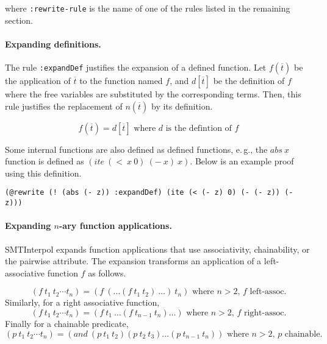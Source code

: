 \documentclass[a4paper]{article}
\newcommand\si{SMTInterpol\xspace}
\begin{document}
where \texttt{:rewrite-rule} is the name of one of the rules listed in
the remaining section.


\paragraph{Expanding definitions.}  The rule \texttt{:expandDef} justifies
the expansion of a defined function.  Let $f(\overline{t})$ be the
application of $\overline{t}$ to the function named $f$, and
$d[\overline{t}]$ be the definition of $f$ where the free variables are
substituted by the corresponding terms.  Then, this rule justifies the
replacement of $n(\overline{t})$ by its definition.

\begin{equation}
f(\overline{t}) = d[\overline{t}]
\text{ where $d$ is the defintion of $f$} \tag{expandDef}
\end{equation}

Some internal functions are also defined as defined functions,
e.\,g., the $abs\ x$ function is defined as $(ite\ (<\ x\ 0)\ (-\ x)\ x)$. Below is an example proof using this definition.
\begin{verbatim}
(@rewrite (! (abs (- z)) :expandDef) (ite (< (- z) 0) (- (- z)) (- z)))
\end{verbatim}

\paragraph{Expanding $n$-ary function applications.}  \si expands function
applications that use associativity, chainability, or the pairwise attribute.
The expansion transforms an application of a left-associative function $f$ as follows.

\begin{equation*}
  (f\ t_1\ t_2 \cdots t_n) = (f\ (\ldots (f\ t_1\ t_2)\ \ldots)\ t_n)
  \text{ where $n > 2$, $f$ left-assoc.}
  \tag{expand}
\end{equation*}
Similarly, for a right associative function,
\begin{equation*}
  (f\ t_1\ t_2 \cdots t_n) = (f\ t_1\ \ldots (f\ t_{n-1}\ t_n)\ldots)
  \text{ where $n > 2$, $f$ right-assoc.}
  \tag{expand}
\end{equation*}
Finally for a chainable predicate,
\begin{equation*}
  (p\ t_1\ t_2 \cdots t_n) = (and\ (p\ t_1\ t_2) (p\ t_2\ t_3) \ldots (p\ t_{n-1}\ t_n))
  \text{ where $n > 2$, $p$ chainable.}
  \tag{expand}
\end{equation*}
\end{document}
